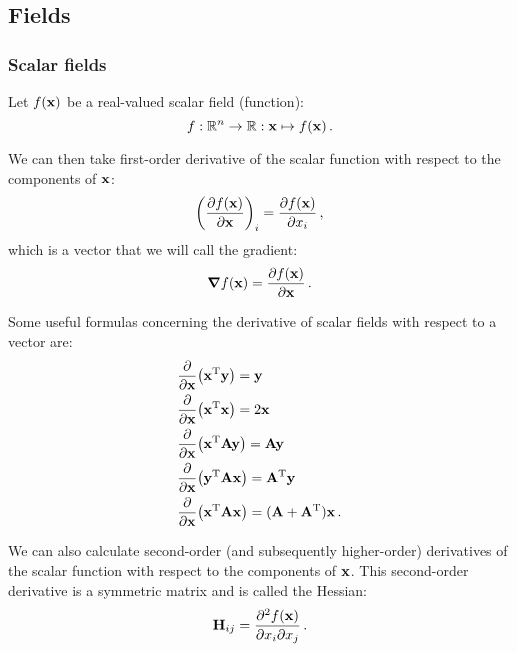 \subsection{Fields}
    \subsubsection{Scalar fields}
        Let $f(\vb{x})$ be a real-valued scalar field (function):
        \begin{equation}
            f: \mathbb{R}^n \rightarrow \mathbb{R}: \vb{x} \mapsto f(\vb{x}) \thinspace .
        \end{equation}

        We can then take first-order derivative of the scalar function with respect to the components of $\vb{x}$:
        \begin{equation}
            \qty(\pdv{f(\vb{x})}{\vb{x}})_i = \pdv{f(\vb{x})}{x_i} \thinspace ,
        \end{equation}
        which is a vector that we will call the gradient:
        \begin{equation}
            \grad{f(\vb{x})} = \pdv{f(\vb{x})}{\vb{x}} \thinspace .
        \end{equation}

        Some useful formulas concerning the derivative of scalar fields with respect to a vector are:
        \begin{align}
            & \pdv{\vb{x}} (\vb{x}^\text{T} \vb{y}) = \vb{y} \\
            & \pdv{\vb{x}} (\vb{x}^\text{T} \vb{x}) = 2 \vb{x} \\
            & \pdv{\vb{x}} (\vb{x}^\text{T} \vb{A} \vb{y}) = \vb{A} \vb{y} \\
            & \pdv{\vb{x}} (\vb{y}^\text{T} \vb{A} \vb{x}) = \vb{A}^\text{T} \vb{y} \\
            & \pdv{\vb{x}} (\vb{x}^\text{T} \vb{A} \vb{x}) = (\vb{A} + \vb{A}^\text{T}) \vb{x} \thinspace .
        \end{align}

        We can also calculate second-order (and subsequently higher-order) derivatives of the scalar function with respect to the components of $\vb{x}$. This second-order derivative is a symmetric matrix and is called the Hessian:
        \begin{equation}
            \vb{H}_{ij} = \pdv{f(\vb{x})}{x_i}{x_j} \thinspace .
        \end{equation}

